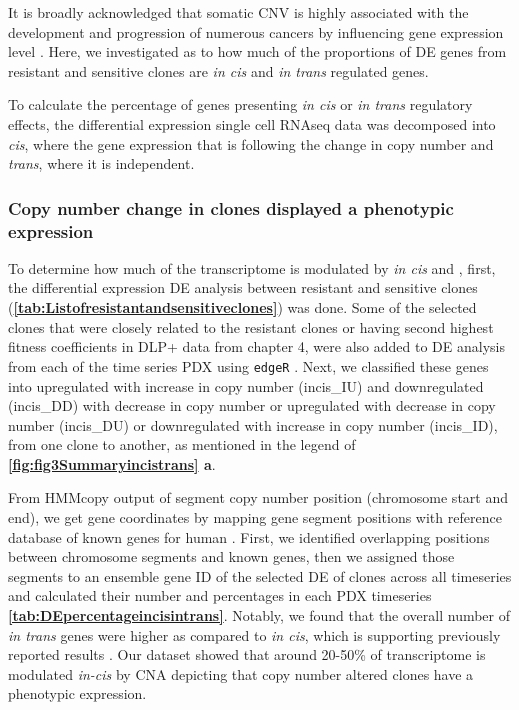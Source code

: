 It is broadly acknowledged that somatic CNV is highly associated with the development and progression of numerous cancers by influencing gene expression level \cite{yang2017prame, gut2018sox2}. 
Here, we investigated as to how much of the proportions of DE genes from resistant and sensitive clones are \textit{in cis} and \textit{in trans} regulated genes. 

To calculate the percentage of genes presenting \textit{in cis} or \textit{in trans} regulatory effects, the differential expression single cell RNAseq data was decomposed into \textit{cis}, where the gene expression that is following the change in copy number and \textit{trans}, where it is independent.

\subsubsection{Copy number change in clones displayed a phenotypic expression}

To determine how much of the transcriptome is modulated by \textit{in cis} and , first, the differential expression \ac{DE} analysis between resistant and sensitive clones  (\textbf{\autoref{tab:Listofresistantandsensitiveclones}}) was done.  Some of the selected clones that were closely related to the resistant clones or having second highest fitness coefficients in DLP+ data from chapter 4, were also added to DE analysis from each of the time series PDX using \texttt{edgeR} \cite{robinson2010edger}. 
Next, we classified these genes into upregulated with increase in copy number (incis\_IU) and downregulated (incis\_DD) with decrease in copy number or upregulated with decrease in copy number (incis\_DU) or downregulated with increase in copy number (incis\_ID), from one clone to another, as mentioned in the legend of \textbf{\autoref{fig:fig3Summaryincistrans} a}.

From HMMcopy output of segment copy number position (chromosome start and end), we get gene coordinates by mapping gene segment positions with reference database of known genes for human  \cite{carlson2015txdb}. First, we identified overlapping positions between chromosome segments and known genes, then we assigned those segments to an ensemble gene ID \cite{rainer2019ensembldb} of the  selected \ac{DE} of clones across all timeseries and calculated their number and percentages in each PDX timeseries  \textbf{\autoref{tab:DEpercentageincisintrans}}. Notably, we found that the overall number of \textit{in trans} genes were higher as compared to \textit{in cis}, which is supporting previously reported results \cite{shao2019copy}. Our dataset showed that around 20-50\% of transcriptome is modulated \textit{in-cis} by \ac{CNA} depicting that copy number altered clones have a phenotypic expression.

